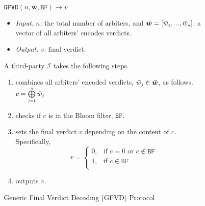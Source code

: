 \begin{figure}[!htbp]
\setlength{\fboxsep}{1pt}
\begin{center}
    \begin{tcolorbox}[enhanced,width=5.5in,
    drop fuzzy shadow southwest,
    colframe=black,colback=white]
    \small{
    \vspace{-1.3mm}
\underline{$\mathtt{GFVD}(n,  \bar{\bm w}, \mathtt{BF})\rightarrow  v$}\\
%
\begin{itemize}
\item \noindent\textit{Input.} $n$:  the total number of  arbiters,  and  $\bar{\bm w}=[\bar{ w}_{\scriptscriptstyle 1},..., \bar{ w}_{\scriptscriptstyle n}]$:  a vector of all arbiters' encodes  verdicts.
%
\item \noindent\textit{Output.} $v$: final verdict.  
%
\end{itemize}
A third-party $\mathcal{I}$ takes the following steps.
\begin{enumerate}
%
%
\item combines  all arbiters' encoded verdicts, $\bar w_{\scriptscriptstyle j}\in \bar{\bm {w}}$, as follows. 
%
$c= \bigoplus\limits^{\scriptscriptstyle n}_{\scriptscriptstyle j=1} \bar w_{\scriptscriptstyle j}$
%
%
\item checks if $c$ is in the Bloom filter, $\mathtt{BF}$. 
%
\item sets the final verdict $v$ depending on the content of $c$. Specifically, 
%
\begin{equation*}
   v= 
\begin{cases}
    0,              &\text{if } c= 0 \text{ or } c \notin\mathtt{BF}\\
   1 ,& \text{if } c \in\mathtt{BF}\\

\end{cases}
\end{equation*}
%
\item outputs  $v$. 
 \end{enumerate}
 
}
\end{tcolorbox}
\end{center}
\caption{Generic Final Verdict Decoding  (GFVD) Protocol} 
\label{fig:GFVD}
\end{figure}

